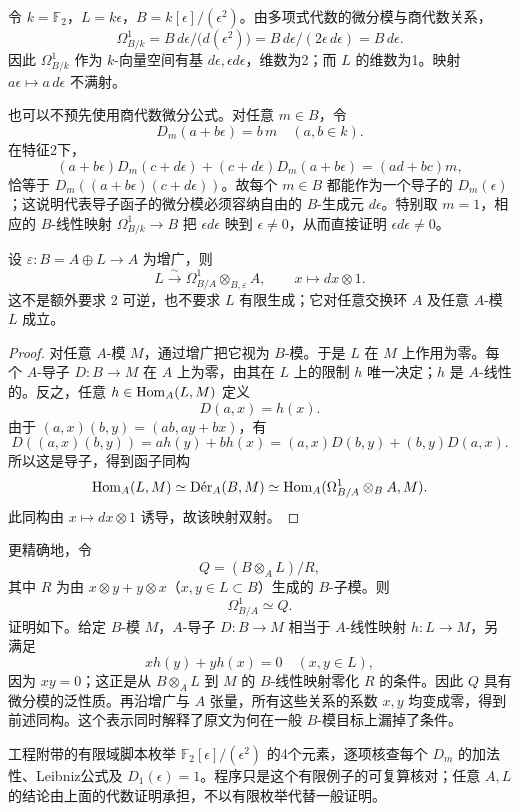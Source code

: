 令 $k=\mathbb F_2$，$L=k\epsilon$，$B=k[\epsilon]/(\epsilon^2)$。由多项式代数的微分模与商代数关系，
\[
 \Omega^1_{B/k}
 =B\,d\epsilon\big/\bigl(d(\epsilon^2)\bigr)
 =B\,d\epsilon\big/(2\epsilon\,d\epsilon)
 =B\,d\epsilon.
\]
因此 $\Omega^1_{B/k}$ 作为 $k$-向量空间有基 $d\epsilon,\epsilon d\epsilon$，维数为2；而 $L$ 的维数为1。映射 $a\epsilon\mapsto a\,d\epsilon$ 不满射。

也可以不预先使用商代数微分公式。对任意 $m\in B$，令
\[
 D_m(a+b\epsilon)=b\,m\quad(a,b\in k).
\]
在特征2下，
\[
 (a+b\epsilon)D_m(c+d\epsilon)
 +(c+d\epsilon)D_m(a+b\epsilon)=(ad+bc)m,
\]
恰等于 $D_m((a+b\epsilon)(c+d\epsilon))$。故每个 $m\in B$ 都能作为一个导子的 $D_m(\epsilon)$；这说明代表导子函子的微分模必须容纳自由的 $B$-生成元 $d\epsilon$。特别取 $m=1$，相应的 $B$-线性映射 $\Omega^1_{B/k}\to B$ 把 $\epsilon d\epsilon$ 映到 $\epsilon\ne0$，从而直接证明 $\epsilon d\epsilon\ne0$。

设 $\varepsilon:B=A\oplus L\to A$ 为增广，则
\[
 L\xrightarrow{\sim}\Omega^1_{B/A}\otimes_{B,\varepsilon}A,
 \qquad x\longmapsto dx\otimes1.
\]
这不是额外要求 $2$ 可逆，也不要求 $L$ 有限生成；它对任意交换环 $A$ 及任意 $A$-模 $L$ 成立。

\begin{proof}
对任意 $A$-模 $M$，通过增广把它视为 $B$-模。于是 $L$ 在 $M$ 上作用为零。每个 $A$-导子 $D:B\to M$ 在 $A$ 上为零，由其在 $L$ 上的限制 $h$ 唯一决定；$h$ 是 $A$-线性的。反之，任意 $h\in\Hom_A(L,M)$ 定义
\[
 D(a,x)=h(x).
\]
由于 $(a,x)(b,y)=(ab,ay+bx)$，有
\[
 D((a,x)(b,y))=a h(y)+b h(x)
 =(a,x)D(b,y)+(b,y)D(a,x).
\]
所以这是导子，得到函子同构
\[
 \Hom_A(L,M)\simeq\Der_A(B,M)
 \simeq\Hom_A(\Omega^1_{B/A}\otimes_B A,M).
\]
此同构由 $x\mapsto dx\otimes1$ 诱导，故该映射双射。
\end{proof}

更精确地，令
\[
 Q=(B\otimes_A L)/R,
\]
其中 $R$ 为由 $x\otimes y+y\otimes x$（$x,y\in L\subset B$）生成的 $B$-子模。则
\[
 \Omega^1_{B/A}\simeq Q.
\]
证明如下。给定 $B$-模 $M$，$A$-导子 $D:B\to M$ 相当于 $A$-线性映射 $h:L\to M$，另满足
\[
 xh(y)+yh(x)=0\quad(x,y\in L),
\]
因为 $xy=0$；这正是从 $B\otimes_A L$ 到 $M$ 的 $B$-线性映射零化 $R$ 的条件。因此 $Q$ 具有微分模的泛性质。再沿增广与 $A$ 张量，所有这些关系的系数 $x,y$ 均变成零，得到前述同构。这个表示同时解释了原文为何在一般 $B$-模目标上漏掉了条件。

工程附带的有限域脚本枚举 $\mathbb F_2[\epsilon]/(\epsilon^2)$ 的4个元素，逐项核查每个 $D_m$ 的加法性、Leibniz公式及 $D_1(\epsilon)=1$。程序只是这个有限例子的可复算核对；任意 $A,L$ 的结论由上面的代数证明承担，不以有限枚举代替一般证明。


